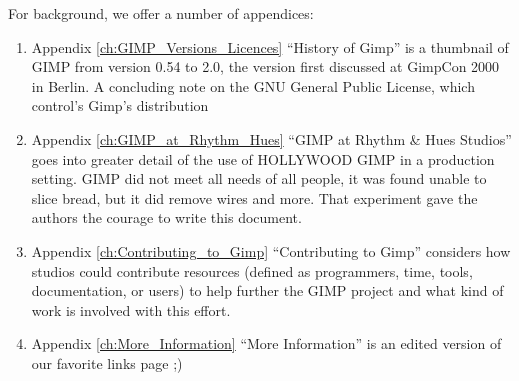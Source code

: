For background, we offer a number of appendices:

\begin{enumerate}

\item Appendix  \ref{ch:GIMP_Versions_Licences} ``History of Gimp'' is a thumbnail of GIMP
from version 0.54 to 2.0, the version first discussed at GimpCon 2000
in Berlin. A concluding note on the GNU General Public License, which
control's Gimp's distribution

\item Appendix  \ref{ch:GIMP_at_Rhythm_Hues}  ``GIMP at Rhythm \& Hues Studios''
goes into greater detail of the use of HOLLYWOOD GIMP in a production
setting. GIMP did not meet all needs of all people, it was found unable to
slice bread, but it did remove wires and more. That experiment gave the 
authors the courage to write this document.

\item Appendix \ref{ch:Contributing_to_Gimp} ``Contributing to Gimp''
considers how studios could contribute resources (defined as
programmers, time, tools, documentation, or users) to help further the
GIMP project and what kind of work is involved with this effort.

\item Appendix \ref{ch:More_Information} ``More Information'' is an
edited version of our favorite links page ;) \end{enumerate}
